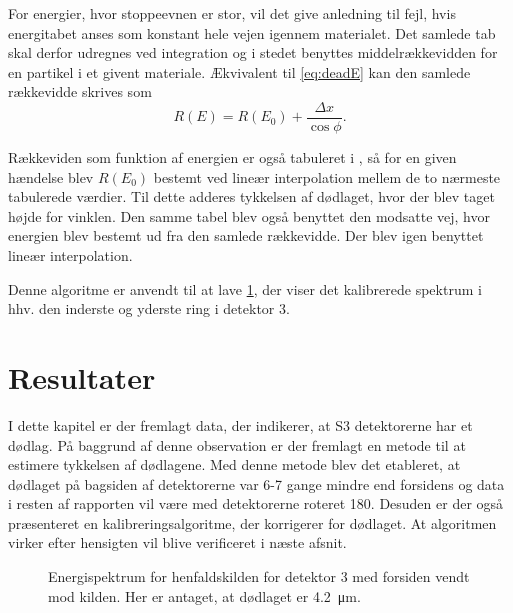 For energier, hvor stoppeevnen er stor, vil det give anledning til fejl, hvis energitabet anses som
konstant hele vejen igennem materialet. Det samlede tab skal derfor udregnes ved integration og
i stedet benyttes middelrækkevidden for en partikel i et givent materiale. Ækvivalent til
\cref{eq:deadE} kan den samlede rækkevidde skrives som
\begin{equation}
  \label{eq:deadR}
  R(E) = R(E_{0}) + \frac{\Delta x}{\cos \phi} .
\end{equation}

Rækkeviden som funktion af energien er også tabuleret i \cite{Ziegler}, så for en given hændelse
blev $R(E_{0})$ bestemt ved lineær interpolation mellem de to nærmeste tabulerede værdier. Til dette
adderes tykkelsen af dødlaget, hvor der blev taget højde for vinklen. Den samme tabel blev også
benyttet den modsatte vej, hvor energien blev bestemt ud fra den samlede rækkevidde. Der blev igen
benyttet lineær interpolation.

Denne algoritme er anvendt til at lave \cref{fig:kalib-spec}, der viser det kalibrerede spektrum i
hhv. den inderste og yderste ring i detektor 3. 

\section{Resultater}
\label{sec:kalib-resultater}

I dette kapitel er der fremlagt data, der indikerer, at S3 detektorerne har et dødlag. På baggrund
af denne observation er der fremlagt en metode til at estimere tykkelsen af dødlagene. Med denne
metode blev det etableret, at dødlaget på bagsiden af detektorerne var 6-7 gange mindre end
forsidens og data i resten af rapporten vil være med detektorerne roteret 180\degree. Desuden er
der også præsenteret en kalibreringsalgoritme, der korrigerer for dødlaget. At algoritmen virker
efter hensigten vil blive verificeret i næste afsnit.

\begin{figure}[hb]
  \centering
  \vspace{-0.2cm}
  \hfill
  \caption{Energispektrum for henfaldskilden for detektor 3 med forsiden vendt mod kilden. Her er
    antaget, at dødlaget er \SI{4.2}{\um}.}
  \label{fig:kalib-spec}
  \vspace{-4cm}
\end{figure}









